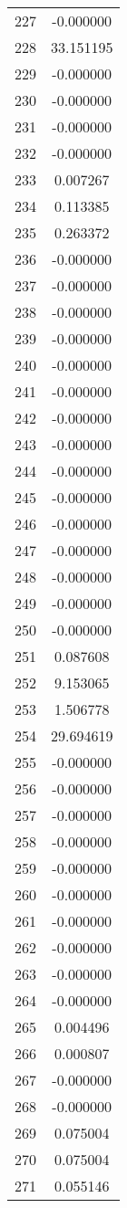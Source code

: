 \documentclass[12pt]{article}
\begin{document}
\begin{longtable}{@{}cc@{}}
227 & -0.000000 \\
228 & 33.151195 \\
229 & -0.000000 \\
230 & -0.000000 \\
231 & -0.000000 \\
232 & -0.000000 \\
233 & 0.007267 \\
234 & 0.113385 \\
235 & 0.263372 \\
236 & -0.000000 \\
237 & -0.000000 \\
238 & -0.000000 \\
239 & -0.000000 \\
240 & -0.000000 \\
241 & -0.000000 \\
242 & -0.000000 \\
243 & -0.000000 \\
244 & -0.000000 \\
245 & -0.000000 \\
246 & -0.000000 \\
247 & -0.000000 \\
248 & -0.000000 \\
249 & -0.000000 \\
250 & -0.000000 \\
251 & 0.087608 \\
252 & 9.153065 \\
253 & 1.506778 \\
254 & 29.694619 \\
255 & -0.000000 \\
256 & -0.000000 \\
257 & -0.000000 \\
258 & -0.000000 \\
259 & -0.000000 \\
260 & -0.000000 \\
261 & -0.000000 \\
262 & -0.000000 \\
263 & -0.000000 \\
264 & -0.000000 \\
265 & 0.004496 \\
266 & 0.000807 \\
267 & -0.000000 \\
268 & -0.000000 \\
269 & 0.075004 \\
270 & 0.075004 \\
271 & 0.055146 \\

\end{longtable}
\end{document}
